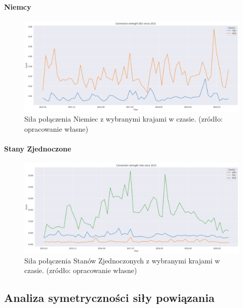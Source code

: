 \documentclass[11pt]{report}
\begin{document}
    \paragraph{Niemcy}

    \begin{figure}[ht]
        \centering
        \includegraphics[width=1 \textwidth]{fig/DEU/DEUConnection.png}
        \caption{Siła połączenia Niemiec z wybranymi krajami w czasie. (zródło: opracowanie własne)}
        \label{fig:DEUConnection}
    \end{figure}

    \paragraph{Stany Zjednoczone}

    \begin{figure}[ht]
        \centering
        \includegraphics[width=1 \textwidth]{fig/USA/USAConnection.png}
        \caption{Siła połączenia Stanów Zjednoczonych z wybranymi krajami w czasie. (zródło: opracowanie własne)}
        \label{fig:USAConnection}
    \end{figure}

    \subsection{Analiza symetryczności siły powiązania}
\end{document}
